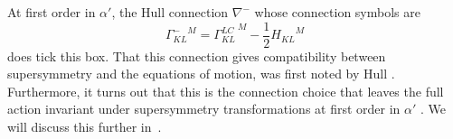 \documentclass[12pt,a4paper]{article}
\def\a{\alpha'}
\def\OO{\mathcal{O}}
\def\H{\mathcal{H}}
\def\H{\mathcal{H}}
\theoremstyle{definition}
\begin{document}
At first order in $\a$, the  Hull connection $\nabla^-$ whose connection symbols are 
\begin{equation}
\label{eq:Hull}
{\Gamma^-_{KL}}^M={\Gamma^{LC}_{KL}}^{\: M}-\frac{1}{2}{H_{KL}}^M
\end{equation}
does tick this box. That this connection gives compatibility between supersymmetry and the equations of motion, was first noted by Hull \cite{Hull:1986kz}. Furthermore, it turns out that this is the connection choice that leaves the full action invariant under supersymmetry transformations at first order in $\a$ \citep{Bergshoeff1989439}.  We will discuss this further in~\citep{delaossa2014}.

\end{document}
